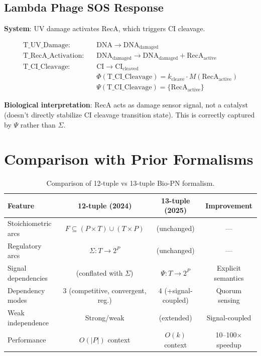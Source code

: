 \documentclass[11pt]{article}
\newcommand{\SignalSet}[1]{{\Psi(#1)}}
\begin{document}
\subsection{Lambda Phage SOS Response}

\textbf{System}: UV damage activates RecA, which triggers CI cleavage.

\begin{equation}
\begin{aligned}
\text{T\_UV\_Damage:} \quad &\text{DNA} \to \text{DNA}_{\text{damaged}} \\
\text{T\_RecA\_Activation:} \quad &\text{DNA}_{\text{damaged}} \to \text{DNA}_{\text{damaged}} + \text{RecA}_{\text{active}} \\
\text{T\_CI\_Cleavage:} \quad &\text{CI} \to \text{CI}_{\text{cleaved}} \\
&\Phi(\text{T\_CI\_Cleavage}) = k_{\text{cleave}} \cdot M(\text{RecA}_{\text{active}}) \\
&\SignalSet{\text{T\_CI\_Cleavage}} = \{\text{RecA}_{\text{active}}\}
\end{aligned}
\end{equation}

\textbf{Biological interpretation}: RecA acts as damage sensor signal, not a catalyst (doesn't directly stabilize CI cleavage transition state). This is correctly captured by $\Psi$ rather than $\Sigma$.

\section{Comparison with Prior Formalisms}

\begin{table}[h]
\centering
\begin{tabular}{lccc}
\hline
\textbf{Feature} & \textbf{12-tuple (2024)} & \textbf{13-tuple (2025)} & \textbf{Improvement} \\
\hline
Stoichiometric arcs & $F \subseteq (P \times T) \cup (T \times P)$ & (unchanged) & --- \\
Regulatory arcs & $\Sigma: T \to 2^P$ & (unchanged) & --- \\
Signal dependencies & (conflated with $\Sigma$) & $\Psi: T \to 2^P$ & Explicit semantics \\
Dependency modes & 3 (competitive, convergent, reg.) & 4 (+signal-coupled) & Quorum sensing \\
Weak independence & Strong/weak & (extended) & Signal-coupled \\
Performance & $O(|P|)$ context & $O(k)$ context & 10--100$\times$ speedup \\
\hline
\end{tabular}
\caption{Comparison of 12-tuple vs 13-tuple Bio-PN formalism.}
\end{table}
\end{document}
